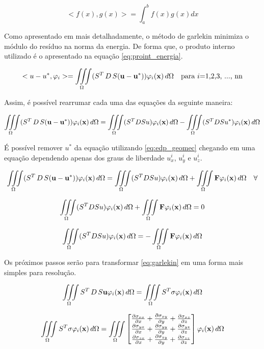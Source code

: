 \begin{equation}
    <f(x), g(x)> = \int^b_af(x)g(x) dx
\end{equation}

Como apresentado em \cite{CompGeomec} mais detalhadamente, o método de garlekin minimiza o módulo do resíduo na norma da energia. De forma que, o produto interno utilizado é o apresentado na equação \ref{eq:proint_energia}.



\begin{equation}
\label{eq:proint_energia}
<u-u^*, \varphi_i> = \omeint{(S^T\,D\,S(\mathbf{u - u^*})) \phiix} \quad \text{para $i$=1,2,3, ..., nn}
\end{equation}

Assim, é possível rearrumar cada uma das equações da seguinte maneira:


\begin{equation}
\omeint{(S^T\,D\,S(\mathbf{u - u^*})) \phiix}  =  \omeint{(S^TDSu)\phiix} - \omeint{(S^TDSu^*)\phiix}
\end{equation}

É possível remover $u^*$ da equação utilizando \ref{eq:edp_geomec} chegando em uma equação dependendo apenas dos graus de liberdade $u^i_x$, $u^i_y$ e $u^i_z$.

\begin{equation}
\omeint{(S^T\,D\,S(\mathbf{u - u^*})) \phiix}  =  \omeint{(S^TDSu)\phiix} + \omeint{\mathbf{F}\phiix} \quad \forall
\end{equation}

\begin{equation}
\omeint{(S^TDSu)\phiix} + \omeint{\mathbf{F}\phiix} = 0
\end{equation}

\begin{equation} \label{eq:garlekin}
\omeint{(S^TDSu)\phiix} = - \omeint{\mathbf{F}\phiix}
\end{equation}



Os próximos passos serão para transformar \ref{eq:garlekin} em uma forma mais simples para resolução.

\begin{equation}
\omeint{S^T\,D\,S\mathbf{u} \phiix} = \omeint{S^T\sigma \phiix}
\end{equation}

\begin{equation}
\omeint{S^T\sigma \phiix} = \omeint{\sstensor \phiix}
\end{equation}

